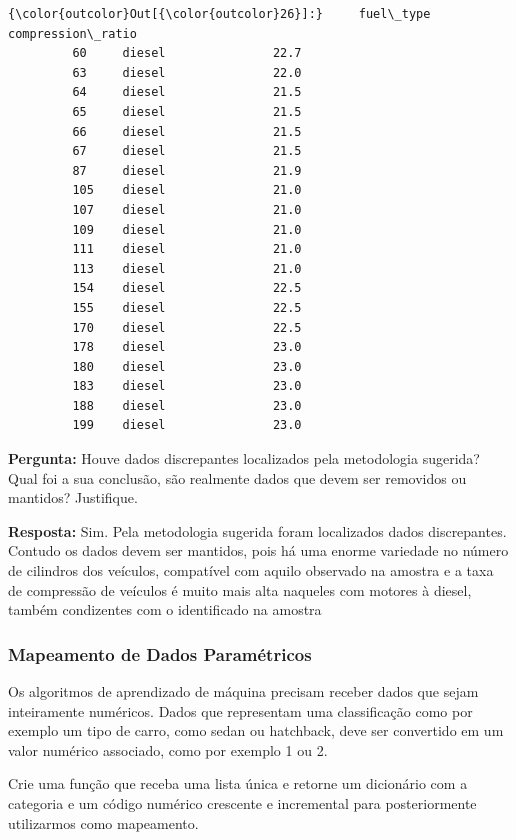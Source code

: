 \documentclass[11pt]{article}
\begin{document}
\begin{Verbatim}[commandchars=\\\{\}]
{\color{outcolor}Out[{\color{outcolor}26}]:}     fuel\_type  compression\_ratio
         60     diesel               22.7
         63     diesel               22.0
         64     diesel               21.5
         65     diesel               21.5
         66     diesel               21.5
         67     diesel               21.5
         87     diesel               21.9
         105    diesel               21.0
         107    diesel               21.0
         109    diesel               21.0
         111    diesel               21.0
         113    diesel               21.0
         154    diesel               22.5
         155    diesel               22.5
         170    diesel               22.5
         178    diesel               23.0
         180    diesel               23.0
         183    diesel               23.0
         188    diesel               23.0
         199    diesel               23.0
\end{Verbatim}
            
    \textbf{Pergunta:} Houve dados discrepantes localizados pela metodologia
sugerida? Qual foi a sua conclusão, são realmente dados que devem ser
removidos ou mantidos? Justifique.

\textbf{Resposta:} Sim. Pela metodologia sugerida foram localizados
dados discrepantes. Contudo os dados devem ser mantidos, pois há uma
enorme variedade no número de cilindros dos veículos, compatível com
aquilo observado na amostra e a taxa de compressão de veículos é muito
mais alta naqueles com motores à diesel, também condizentes com o
identificado na amostra

    \subsubsection{Mapeamento de Dados
Paramétricos}\label{mapeamento-de-dados-paramuxe9tricos}

    Os algoritmos de aprendizado de máquina precisam receber dados que sejam
inteiramente numéricos. Dados que representam uma classificação como por
exemplo um tipo de carro, como sedan ou hatchback, deve ser convertido
em um valor numérico associado, como por exemplo 1 ou 2.

Crie uma função que receba uma lista única e retorne um dicionário com a
categoria e um código numérico crescente e incremental para
posteriormente utilizarmos como mapeamento.
\end{document}
